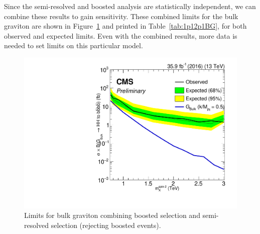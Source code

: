 Since the semi-resolved and boosted analysis are statistically independent, we can combine these results to gain sensitivity. These combined limits for the bulk graviton are shown in Figure~\ref{fig:1p12p1BG} and printed in Table~\ref{tab:1p12p1BG}, for both observed and expected limits. Even with the combined results, more data is needed to set limits on this particular model.

\begin{figure}[thb!]
\begin{center}
\includegraphics[scale=0.5]{F5/bulk.pdf}
\end{center}
\caption{Limits for bulk graviton combining boosted selection and semi-resolved selection (rejecting boosted events).}
\label{fig:1p12p1BG}
\end{figure} 

